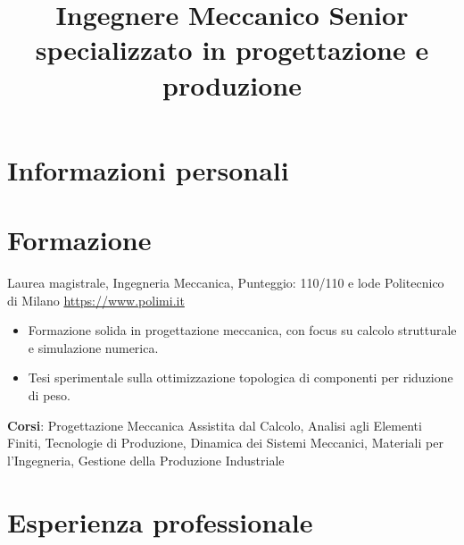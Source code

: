 \documentclass[a4paper, serif, 10pt]{moderncv}
\title{Ingegnere Meccanico Senior specializzato in progettazione e produzione}
\begin{document}
\maketitle

\section{Informazioni personali}

\section{Formazione}

        {Laurea magistrale, Ingegneria Meccanica, Punteggio: 110/110 e lode}
        {Politecnico di Milano}
        {\url{https://www.polimi.it}}
        {}
        {\begin{itemize}
\item Formazione solida in progettazione meccanica, con focus su calcolo strutturale e simulazione numerica.
\item Tesi sperimentale sulla ottimizzazione topologica di componenti per riduzione di peso.
\end{itemize}
\textbf{Corsi}: Progettazione Meccanica Assistita dal Calcolo, Analisi agli Elementi Finiti, Tecnologie di Produzione, Dinamica dei Sistemi Meccanici, Materiali per l'Ingegneria, Gestione della Produzione Industriale}
\section{Esperienza professionale}
\end{document}

